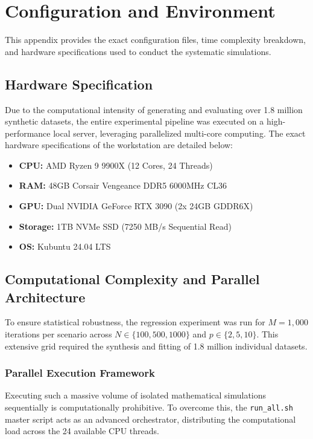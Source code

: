 \chapter{Configuration and Environment}
\label{chap:appendices}

This appendix provides the exact configuration files, time complexity breakdown, and hardware specifications used to conduct the systematic simulations.

\section{Hardware Specification}
\label{sec:app-hardware}
Due to the computational intensity of generating and evaluating over 1.8 million synthetic datasets, the entire experimental pipeline was executed on a high-performance local server, leveraging parallelized multi-core computing. The exact hardware specifications of the workstation are detailed below:
\begin{itemize}
    \item \textbf{CPU:} AMD Ryzen 9 9900X (12 Cores, 24 Threads)
    \item \textbf{RAM:} 48GB Corsair Vengeance DDR5 6000MHz CL36
    \item \textbf{GPU:} Dual NVIDIA GeForce RTX 3090 (2x 24GB GDDR6X)
    \item \textbf{Storage:} 1TB NVMe SSD (7250 MB/s Sequential Read)
    \item \textbf{OS:} Kubuntu 24.04 LTS
\end{itemize}

\section{Computational Complexity and Parallel Architecture}
\label{sec:app-time-complexity}
To ensure statistical robustness, the regression experiment was run for $M = 1,000$ iterations per scenario across $N \in \{100, 500, 1000\}$ and $p \in \{2, 5, 10\}$. This extensive grid required the synthesis and fitting of 1.8 million individual datasets.

\subsection{Parallel Execution Framework}
Executing such a massive volume of isolated mathematical simulations sequentially is computationally prohibitive. To overcome this, the \texttt{run\_all.sh} master script acts as an advanced orchestrator, distributing the computational load across the 24 available CPU threads. 

